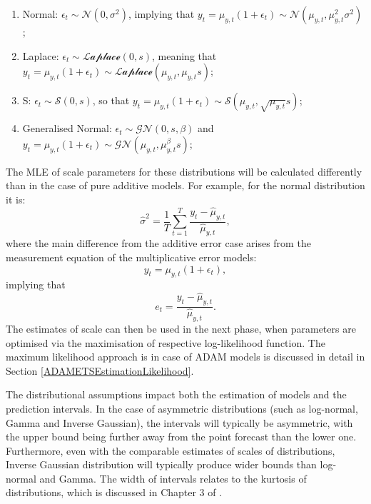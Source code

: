 \documentclass[]{book}
\providecommand{\tightlist}{%
  \setlength{\itemsep}{0pt}\setlength{\parskip}{0pt}}
\theoremstyle{definition}
\theoremstyle{definition}
\theoremstyle{definition}
\theoremstyle{definition}
\theoremstyle{remark}
\begin{document}
\begin{enumerate}
\def\labelenumi{\arabic{enumi}.}
\tightlist
\item
  Normal: \(\epsilon_t \sim \mathcal{N}(0, \sigma^2)\), implying that \(y_t = \mu_{y,t} (1+\epsilon_t) \sim \mathcal{N}(\mu_{y,t}, \mu_{y,t}^2 \sigma^2)\);
\item
  Laplace: \(\epsilon_t \sim \mathcal{Laplace}(0, s)\), meaning that \(y_t = \mu_{y,t} (1+\epsilon_t) \sim \mathcal{Laplace}(\mu_{y,t}, \mu_{y,t} s)\);
\item
  S: \(\epsilon_t \sim \mathcal{S}(0, s)\), so that \(y_t = \mu_{y,t} (1+\epsilon_t) \sim \mathcal{S}(\mu_{y,t}, \sqrt{\mu_{y,t}} s)\);
\item
  Generalised Normal: \(\epsilon_t \sim \mathcal{GN}(0, s, \beta)\) and \(y_t = \mu_{y,t} (1+\epsilon_t) \sim \mathcal{GN}(\mu_{y,t}, \mu_{y,t}^\beta s)\);
\end{enumerate}

The MLE of scale parameters for these distributions will be calculated differently than in the case of pure additive models. For example, for the normal distribution it is:
\begin{equation}
    \hat{\sigma}^2 = \frac{1}{T}\sum_{t=1}^T \frac{y_t-\hat{\mu}_{y,t}}{\hat{\mu}_{y,t}} ,
    \label{eq:ETSMultiplicativeErrorMLESigmaNormal}
\end{equation}
where the main difference from the additive error case arises from the measurement equation of the multiplicative error models:
\begin{equation}
    y_t = \mu_{y,t} (1+\epsilon_t),
    \label{eq:ETSMultiplicativeErrorMeasurement}
\end{equation}
implying that
\begin{equation}
    e_t = \frac{y_t-\hat{\mu}_{y,t}}{\hat{\mu}_{y,t}}.
    \label{eq:ETSMultiplicativeErrorFormula}
\end{equation}
The estimates of scale can then be used in the next phase, when parameters are optimised via the maximisation of respective log-likelihood function. The maximum likelihood approach is in case of ADAM models is discussed in detail in Section \ref{ADAMETSEstimationLikelihood}.

The distributional assumptions impact both the estimation of models and the prediction intervals. In the case of asymmetric distributions (such as log-normal, Gamma and Inverse Gaussian), the intervals will typically be asymmetric, with the upper bound being further away from the point forecast than the lower one. Furthermore, even with the comparable estimates of scales of distributions, Inverse Gaussian distribution will typically produce wider bounds than log-normal and Gamma. The width of intervals relates to the kurtosis of distributions, which is discussed in Chapter 3 of \citet{SvetunkovSBA}.
\end{document}
